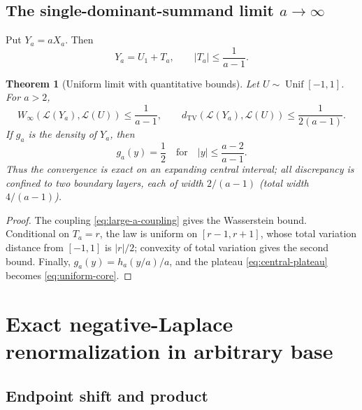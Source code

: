 \documentclass[11pt,oneside]{article}
\newtheorem{theorem}{Theorem}[section]
\theoremstyle{definition}
\theoremstyle{remark}
\newcommand{\TV}{d_{\mathrm{TV}}}
\newcommand{\Wass}{W_{\infty}}
\begin{document}
\subsection{The single-dominant-summand limit $a\to\infty$}

Put $Y_a=aX_a$.  Then
\begin{equation}
 Y_a=U_1+T_a,
 \qquad
 |T_a|\le\frac1{a-1}.
 \label{eq:large-a-coupling}
\end{equation}

\begin{theorem}[Uniform limit with quantitative bounds]
\label{thm:uniform-limit}
Let $U\sim\operatorname{Unif}[-1,1]$.  For $a>2$,
\begin{equation}
 \Wass(\mathcal L(Y_a),\mathcal L(U))\le\frac1{a-1},
 \qquad
 \TV(\mathcal L(Y_a),\mathcal L(U))\le\frac1{2(a-1)}.
 \label{eq:uniform-bounds}
\end{equation}
If $g_a$ is the density of $Y_a$, then
\begin{equation}
 g_a(y)=\frac12
 \quad\text{for}\quad
 |y|\le\frac{a-2}{a-1}.
 \label{eq:uniform-core}
\end{equation}
Thus the convergence is exact on an expanding central interval; all discrepancy is confined
to two boundary layers, each of width $2/(a-1)$ (total width $4/(a-1)$).
\end{theorem}

\begin{proof}
The coupling \eqref{eq:large-a-coupling} gives the Wasserstein bound.  Conditional on
$T_a=r$, the law is uniform on $[r-1,r+1]$, whose total variation distance from
$[-1,1]$ is $|r|/2$; convexity of total variation gives the second bound.  Finally,
$g_a(y)=h_a(y/a)/a$, and the plateau \eqref{eq:central-plateau} becomes
\eqref{eq:uniform-core}.
\end{proof}

\section{Exact negative-Laplace renormalization in arbitrary base}
\label{sec:laplace-general}

\subsection{Endpoint shift and product}
\end{document}
